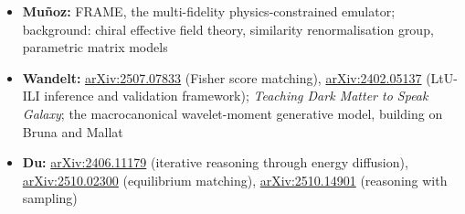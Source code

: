 \documentclass[11pt]{article}
\begin{document}
\begin{itemize}[leftmargin=*]
    \item \textbf{Mu\~noz:} FRAME, the multi-fidelity physics-constrained emulator; background: chiral effective field theory, similarity renormalisation group, parametric matrix models
    \item \textbf{Wandelt:} \href{https://arxiv.org/abs/2507.07833}{arXiv:2507.07833} (Fisher score matching), \href{https://arxiv.org/abs/2402.05137}{arXiv:2402.05137} (LtU-ILI inference and validation framework); \emph{Teaching Dark Matter to Speak Galaxy}; the macrocanonical wavelet-moment generative model, building on Bruna and Mallat
    \item \textbf{Du:} \href{https://arxiv.org/abs/2406.11179}{arXiv:2406.11179} (iterative reasoning through energy diffusion), \href{https://arxiv.org/abs/2510.02300}{arXiv:2510.02300} (equilibrium matching), \href{https://arxiv.org/abs/2510.14901}{arXiv:2510.14901} (reasoning with sampling)
\end{itemize}
\end{document}
